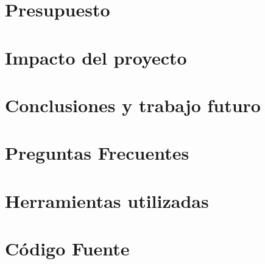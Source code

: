 \chapter{Presupuesto}
\label{sec:cap4}


\chapter{Impacto del proyecto}
\label{sec:cap5}


\chapter{Conclusiones y trabajo futuro}
\label{sec:cap6}



\label{sec:bibliografía}
\printbibliography

\appendix
\label{sec:apendice}
\chapter{Preguntas Frecuentes}

\chapter{Herramientas utilizadas}

\chapter{Código Fuente}
\label{sec:codigofuente}


